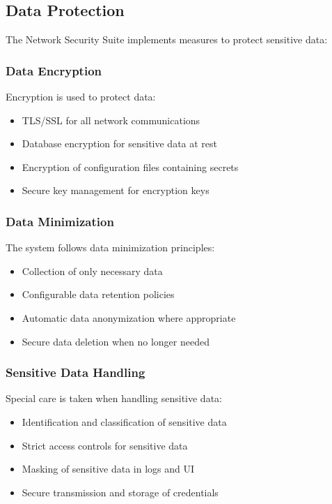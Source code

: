 \subsection{Data Protection}
The Network Security Suite implements measures to protect sensitive data:

\subsubsection{Data Encryption}
Encryption is used to protect data:

\begin{itemize}
    \item TLS/SSL for all network communications
    \item Database encryption for sensitive data at rest
    \item Encryption of configuration files containing secrets
    \item Secure key management for encryption keys
\end{itemize}

\subsubsection{Data Minimization}
The system follows data minimization principles:

\begin{itemize}
    \item Collection of only necessary data
    \item Configurable data retention policies
    \item Automatic data anonymization where appropriate
    \item Secure data deletion when no longer needed
\end{itemize}

\subsubsection{Sensitive Data Handling}
Special care is taken when handling sensitive data:

\begin{itemize}
    \item Identification and classification of sensitive data
    \item Strict access controls for sensitive data
    \item Masking of sensitive data in logs and UI
    \item Secure transmission and storage of credentials
\end{itemize}

